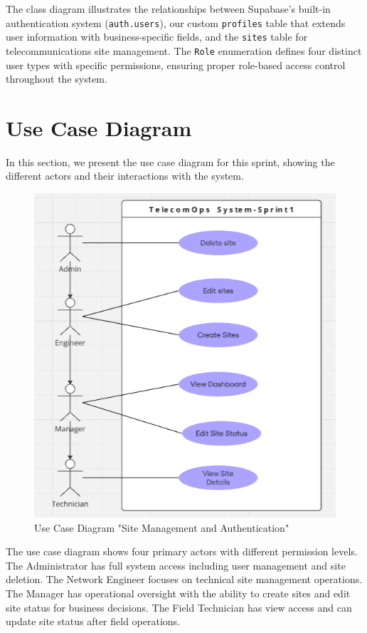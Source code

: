 The class diagram illustrates the relationships between Supabase's built-in authentication system (\texttt{auth.users}), our custom \texttt{profiles} table that extends user information with business-specific fields, and the \texttt{sites} table for telecommunications site management. The \texttt{Role} enumeration defines four distinct user types with specific permissions, ensuring proper role-based access control throughout the system.

\section{Use Case Diagram}

In this section, we present the use case diagram for this sprint, showing the different actors and their interactions with the system.

\begin{figure}[H]
    \centering
    \includegraphics[width=0.85\linewidth]{img/chap_03/use_case_diagram_sprint1.png}
    \caption{Use Case Diagram "Site Management and Authentication"}
    \label{fig:use_case_diagram_sprint1}
\end{figure}

The use case diagram shows four primary actors with different permission levels. The Administrator has full system access including user management and site deletion. The Network Engineer focuses on technical site management operations. The Manager has operational oversight with the ability to create sites and edit site status for business decisions. The Field Technician has view access and can update site status after field operations.


